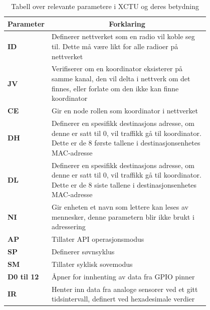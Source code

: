 \documentclass{article}
\begin{document}
\begin{table}[htbp]
\centering
\begin{tabular}{|l|p{0.8\linewidth}|}
\hline
\multicolumn{1}{|c|}{\textbf{Parameter}} & \multicolumn{1}{c|}{\textbf{Forklaring}}                                                   
\tabularnewline \hline

\textbf{ID}                                               & Definerer nettverket som en radio vil koble seg til. Dette må være likt for alle radioer på nettverket 
\tabularnewline \hline

\textbf{JV}                                              & Verifiserer om en koordinator eksisterer på samme kanal, den vil delta i nettverk om det finnes, eller forlate om den ikke kan finne koordinator \tabularnewline \hline

\textbf{CE}                                         	& Gir en node rollen som koordinator i nettverket \tabularnewline \hline

\textbf{DH}                                             & Definerer en spesifikk destinasjons adresse, om denne er satt til 0, vil traffikk gå til koordinator. Dette er de 8 første tallene i destinasjonsenhetes MAC-adresse
 \tabularnewline \hline
 
\textbf{DL}                                              & Definerer en spesifikk destinasjons adresse, om denne er satt til 0, vil traffikk gå til koordinator. Dette er de 8 siste tallene i destinasjonsenhetes MAC-adresse 
\tabularnewline \hline

\textbf{NI}                                                  & Gir enheten et navn  som lettere kan leses av mennesker, denne parametern blir ikke brukt i adressering
\tabularnewline \hline

\textbf{AP}                                            		& Tillater API operasjonsmodus
\tabularnewline \hline

\textbf{SP}                                                 & Definerer søvnsyklus
\tabularnewline \hline

\textbf{SM}                                                  & Tillater syklisk sovemodus
\tabularnewline \hline

\textbf{D0 til 12}                                          & Åpner for innhenting av data fra GPIO pinner
\tabularnewline \hline

\textbf{IR}                                                  & Henter inn data fra analoge sensorer ved et gitt tidsintervall, definert ved hexadesimale verdier
\tabularnewline \hline
\end{tabular}
\caption{Tabell over relevante parametere i XCTU og deres betydning}
\label{table:XCTU tabell}   
\end{table}
\end{document}
